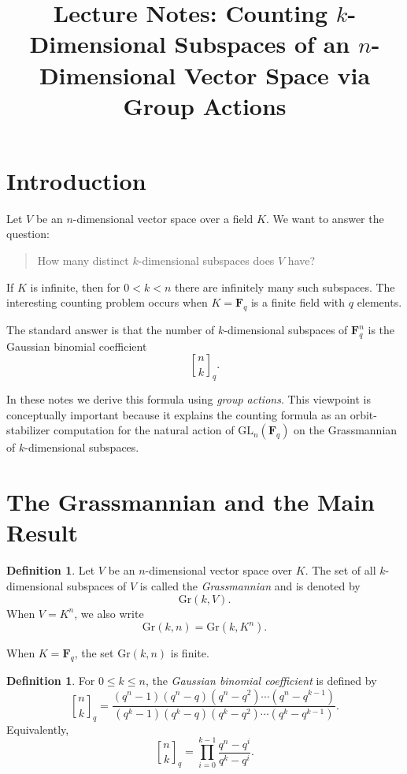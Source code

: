 \documentclass[11pt]{article}
\title{Lecture Notes: Counting \(k\)-Dimensional Subspaces of an \(n\)-Dimensional Vector Space via Group Actions}
\author{}
\date{}
\theoremstyle{definition}
\newtheorem{definition}[theorem]{Definition}
\theoremstyle{remark}
\newcommand{\F}{\mathbf{F}}
\newcommand{\GL}{\mathrm{GL}}
\newcommand{\Gr}{\mathrm{Gr}}
\newcommand{\qbinom}[2]{\genfrac{[}{]}{0pt}{}{#1}{#2}_q}
\begin{document}
	
	\maketitle
	
	\tableofcontents
	
	\section{Introduction}
	
	Let \(V\) be an \(n\)-dimensional vector space over a field \(K\). We want to answer the question:
	
	\begin{quote}
		How many distinct \(k\)-dimensional subspaces does \(V\) have?
	\end{quote}
	
	If \(K\) is infinite, then for \(0<k<n\) there are infinitely many such subspaces. The interesting counting problem occurs when \(K=\F_q\) is a finite field with \(q\) elements.
	
	The standard answer is that the number of \(k\)-dimensional subspaces of \(\F_q^n\) is the Gaussian binomial coefficient
	\[
	\qbinom{n}{k}.
	\]
	
	In these notes we derive this formula using \emph{group actions}. This viewpoint is conceptually important because it explains the counting formula as an orbit-stabilizer computation for the natural action of \(\GL_n(\F_q)\) on the Grassmannian of \(k\)-dimensional subspaces.
	
	\section{The Grassmannian and the Main Result}
	
	\begin{definition}
		Let \(V\) be an \(n\)-dimensional vector space over \(K\). The set of all \(k\)-dimensional subspaces of \(V\) is called the \emph{Grassmannian} and is denoted by
		\[
		\Gr(k,V).
		\]
		When \(V=K^n\), we also write
		\[
		\Gr(k,n)=\Gr(k,K^n).
		\]
	\end{definition}
	
	When \(K=\F_q\), the set \(\Gr(k,n)\) is finite.
	
	\begin{definition}
		For \(0\le k\le n\), the \emph{Gaussian binomial coefficient} is defined by
		\[
		\qbinom{n}{k}
		=
		\frac{(q^n-1)(q^n-q)(q^n-q^2)\cdots(q^n-q^{k-1})}
		{(q^k-1)(q^k-q)(q^k-q^2)\cdots(q^k-q^{k-1})}.
		\]
		Equivalently,
		\[
		\qbinom{n}{k}
		=
		\prod_{i=0}^{k-1}\frac{q^n-q^i}{q^k-q^i}.
		\]
	\end{definition}
	
\end{document}
